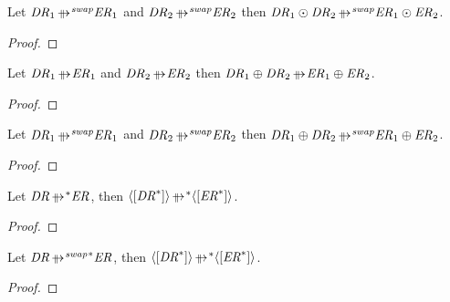 \documentclass[numbers]{sigplanconf}
\begin{document}
\begin{lemma}
  \label{lem:parallel-rewrite-swap-concatenation}
  Let $\DNFRegex_1 \ParallelRewriteSwap \DNFRegexAlt_1$ and $\DNFRegex_2
  \ParallelRewriteSwap \DNFRegexAlt_2$ then
  $\DNFRegex_1 \ConcatDNF \DNFRegex_2 \ParallelRewriteSwap
  \DNFRegexAlt_1 \ConcatDNF \DNFRegexAlt_2$.
\end{lemma}
\begin{proof}
\end{proof}

\begin{lemma}
  \label{lem:parallel-rewrite-concatenation}
  Let $\DNFRegex_1 \ParallelRewrite \DNFRegexAlt_1$ and $\DNFRegex_2
  \ParallelRewrite \DNFRegexAlt_2$ then
  $\DNFRegex_1 \OrDNF \DNFRegex_2 \ParallelRewrite
  \DNFRegexAlt_1 \OrDNF \DNFRegexAlt_2$.
\end{lemma}
\begin{proof}
\end{proof}

\begin{lemma}
  \label{lem:parallel-rewrite-swap-concatenation}
  Let $\DNFRegex_1 \ParallelRewriteSwap \DNFRegexAlt_1$ and $\DNFRegex_2
  \ParallelRewriteSwap \DNFRegexAlt_2$ then
  $\DNFRegex_1 \OrDNF \DNFRegex_2 \ParallelRewriteSwap
  \DNFRegexAlt_1 \OrDNF \DNFRegexAlt_2$.
\end{lemma}
\begin{proof}
\end{proof}

\begin{lemma}
  \label{lem:parallel-rewrite-iteration}
  Let $\DNFRegex \StarOf{\ParallelRewrite} \DNFRegexAlt$, then
  $\DNFOf{\SequenceOf{\StarOf{\DNFRegex}}} \StarOf{\ParallelRewrite}
  \DNFOf{\SequenceOf{\StarOf{\DNFRegexAlt}}}$.
\end{lemma}
\begin{proof}
\end{proof}

\begin{lemma}
  \label{lem:parallel-rewrite-swap-iteration}
  Let $\DNFRegex \StarOf{\ParallelRewriteSwap} \DNFRegexAlt$, then
  $\DNFOf{\SequenceOf{\StarOf{\DNFRegex}}} \StarOf{\ParallelRewrite}
  \DNFOf{\SequenceOf{\StarOf{\DNFRegexAlt}}}$.
\end{lemma}
\begin{proof}
\end{proof}
\end{document}
